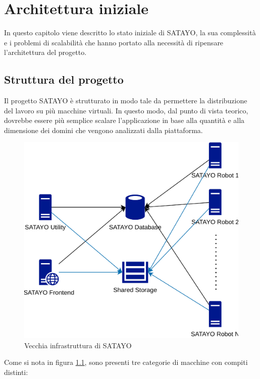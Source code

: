 \chapter{Architettura iniziale}
\label{cha:architettura_iniziale}

In questo capitolo viene descritto lo stato iniziale di SATAYO, la sua complessità
e i problemi di scalabilità che hanno portato alla necessità di ripensare l'architettura
del progetto.

\section{Struttura del progetto}
\label{sec:struttura}

Il progetto SATAYO è strutturato in modo tale da permettere la distribuzione del
lavoro su più macchine virtuali. In questo modo, dal punto di vista teorico, dovrebbe
essere più semplice scalare l'applicazione in base alla quantità e alla dimensione
dei domini che vengono analizzati dalla piattaforma.

\begin{figure}[h!]
  \centering
  \includegraphics[width=.6\linewidth]{images/SATAYO_infrastructure_old.png}
  \caption{Vecchia infrastruttura di SATAYO}
  \label{fig:infra_old}
\end{figure}

Come si nota in figura \ref{fig:infra_old}, sono presenti tre categorie di macchine
con compiti distinti:

